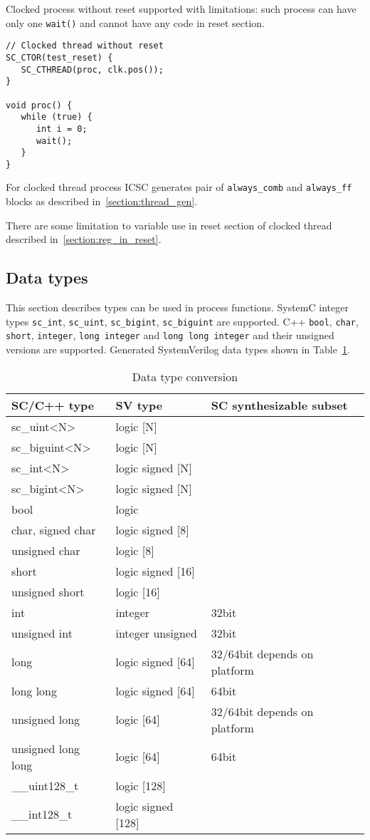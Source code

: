 Clocked process without reset supported with limitations: such process can have only one {\tt wait()} and cannot have any code in reset section.

\begin{lstlisting}[style=mycpp]
// Clocked thread without reset
SC_CTOR(test_reset) {
   SC_CTHREAD(proc, clk.pos());
}

void proc() {
   while (true) {
      int i = 0;
      wait();
   }
}
\end{lstlisting}

For clocked thread process ICSC generates pair of {\tt always\_comb} and {\tt always\_ff} blocks as described in~\ref{section:thread_gen}.

There are some limitation to variable use in reset section of clocked thread described in~\ref{section:reg_in_reset}.

\subsection{Data types}

This section describes types can be used in process functions. 
SystemC integer types {\tt sc\_int}, {\tt sc\_uint}, {\tt sc\_bigint}, {\tt sc\_biguint} are supported. C++ {\tt bool}, {\tt char}, {\tt short}, {\tt integer}, {\tt long integer} and {\tt long long integer} and their unsigned versions are supported. Generated SystemVerilog data types shown in Table~\ref{tab:data_types}.

\begin{table}
\begin{tabular}{|l|l|l|}
\hline
SC/C++ type & SV type  & SC synthesizable subset \\
\hline
sc\_uint<N> & logic [N] & \\
sc\_biguint<N> & logic [N] & \\
sc\_int<N> & logic signed [N] & \\
sc\_bigint<N> & logic signed [N] & \\
bool & logic & \\
char, signed char & logic signed [8] & \\
unsigned char & logic [8] & \\
short & logic signed [16] & \\
unsigned short & logic [16] & \\
int & integer & 32bit \\
unsigned int & integer unsigned & 32bit \\
long & logic signed [64] & 32/64bit depends on platform \\
long long & logic signed [64] & 64bit \\
unsigned long & logic [64] & 32/64bit depends on platform \\
unsigned long long & logic [64] & 64bit \\
\_\_uint128\_t & logic [128] & \\
\_\_int128\_t & logic signed [128] & \\
\hline
\end{tabular}
\caption{Data type conversion}
\label{tab:data_types}
\end{table}

